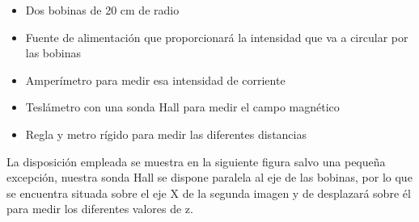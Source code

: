 \documentclass[a4paper,12pt,titlepage]{article}
\begin{document}
\begin{itemize}
    \item Dos bobinas de 20 cm de radio
    \item Fuente de alimentación que proporcionará la intensidad que va a circular por las bobinas
    \item Amperímetro para medir esa intensidad de corriente
    \item Teslámetro con una sonda Hall para medir el campo magnético
    \item Regla y metro rígido para medir las diferentes distancias
\end{itemize}

La disposición empleada se muestra en la siguiente figura salvo una pequeña excepción, nuestra sonda Hall se dispone paralela al eje de las bobinas, por lo que se encuentra situada sobre el eje X de la segunda imagen y de desplazará sobre él para medir los diferentes valores de z.
\end{document}
